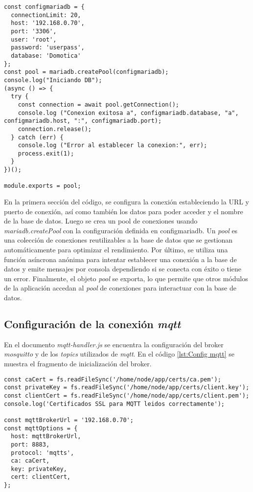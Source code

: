 \begin{lstlisting}[caption={Conexión con la base de datos.}, label={lst:Conexion de base}]
const configmariadb = {
  connectionLimit: 20,
  host: '192.168.0.70',
  port: '3306',
  user: 'root',
  password: 'userpass',
  database: 'Domotica'
};
const pool = mariadb.createPool(configmariadb);
console.log("Iniciando DB");
(async () => {
  try {
    const connection = await pool.getConnection();
    console.log ("Conexion exitosa a", configmariadb.database, "a", configmariadb.host, ":", configmariadb.port);
    connection.release();
  } catch (err) {
    console.log ("Error al establecer la conexion:", err);
    process.exit(1);
  }
})();

module.exports = pool;
\end{lstlisting}

En la primera sección del código, se configura la conexión estableciendo la URL y puerto de conexión, así como también los datos para poder acceder y el nombre de la base de datos. Luego se crea un pool de conexiones usando \textit{mariadb.createPool} con la configuración definida en configmariadb. Un \textit{pool} es una colección de conexiones reutilizables a la base de datos que se gestionan automáticamente para optimizar el rendimiento. Por último, se utiliza una función asíncrona anónima para intentar establecer una conexión a la base de datos y emite mensajes por consola dependiendo si se conecta con éxito o tiene un error. Finalmente, el objeto \textit{pool} se exporta, lo que permite que otros módulos de la aplicación accedan al \textit{pool} de conexiones para interactuar con la base de datos.

\subsection{Configuración de la conexión \textit{mqtt}}

En el documento \textit{mqtt-handler.js} se encuentra la configuración del broker \textit{mosquitto} y de los \textit{topics} utilizados de \textit{mqtt}. En el código \ref{lst:Config mqtt} se muestra el fragmento de inicialización del broker.

\begin{lstlisting}[caption={Inicialización del broker MQTT.}, label={lst:Config mqtt}]
const caCert = fs.readFileSync('/home/node/app/certs/ca.pem');
const privateKey = fs.readFileSync('/home/node/app/certs/client.key');
const clientCert = fs.readFileSync('/home/node/app/certs/client.pem');
console.log('Certificados SSL para MQTT leidos correctamente');

const mqttBrokerUrl = '192.168.0.70';
const mqttOptions = {
  host: mqttBrokerUrl,
  port: 8883,
  protocol: 'mqtts',
  ca: caCert,
  key: privateKey,
  cert: clientCert,
};
\end{lstlisting}

